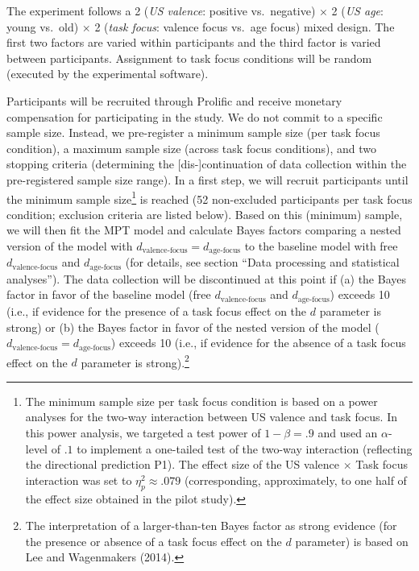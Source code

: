 \documentclass[
  doc,floatsintext]{apa6}
\begin{document}
The experiment follows a 2 (\emph{US valence}: positive vs.~negative) \(\times\) 2 (\emph{US age}: young vs.~old) \(\times\) 2 (\emph{task focus}: valence focus vs.~age focus) mixed design.
The first two factors are varied within participants and the third factor is varied between participants.
Assignment to task focus conditions will be random (executed by the experimental software).

Participants will be recruited through Prolific and receive monetary compensation for participating in the study.
We do not commit to a specific sample size.
Instead, we pre-register a minimum sample size (per task focus condition), a maximum sample size (across task focus conditions), and two stopping criteria (determining the {[}dis-{]}continuation of data collection within the pre-registered sample size range).
In a first step, we will recruit participants until the minimum sample size\footnote{The minimum sample size per task focus condition is based on a power analyses for the two-way interaction between US valence and task focus. In this power analysis, we targeted a test power of \(1-\beta=.9\) and used an \(\alpha\)-level of \(.1\) to implement a one-tailed test of the two-way interaction (reflecting the directional prediction P1). The effect size of the US valence \(\times\) Task focus interaction was set to \(\eta^2_{p}\approx.079\) (corresponding, approximately, to one half of the effect size obtained in the pilot study).} is reached (52 non-excluded participants per task focus condition; exclusion criteria are listed below).
Based on this (minimum) sample, we will then fit the MPT model and calculate Bayes factors comparing a nested version of the model with \(d_\textrm{valence-focus}=d_\textrm{age-focus}\) to the baseline model with free \(d_\textrm{valence-focus}\) and \(d_\textrm{age-focus}\) (for details, see section ``Data processing and statistical analyses'').
The data collection will be discontinued at this point if (a) the Bayes factor in favor of the baseline model (free \(d_\textrm{valence-focus}\) and \(d_\textrm{age-focus}\)) exceeds 10 (i.e., if evidence for the presence of a task focus effect on the \(d\) parameter is strong) or (b)
the Bayes factor in favor of the nested version of the model (\(d_\textrm{valence-focus}=d_\textrm{age-focus}\)) exceeds 10 (i.e., if evidence for the absence of a task focus effect on the \(d\) parameter is strong).\footnote{The interpretation of a larger-than-ten Bayes factor as strong evidence (for the presence or absence of a task focus effect on the \(d\) parameter) is based on Lee and Wagenmakers (2014).}
\end{document}
